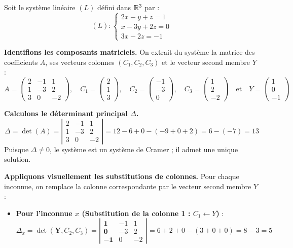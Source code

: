 \documentclass[12pt, a4paper]{report}
\begin{document}
\begin{example}
    Soit le système linéaire $(L)$ défini dans $\mathbb{R}^3$ par :
    $$(L) : \begin{cases}
        2x - y + z = 1 \\
        x - 3y + 2z = 0 \\
        3x - 2z = -1
    \end{cases}$$

    \textbf{Identifions les composants matriciels.} On extrait du système la matrice des coefficients $A$, ses vecteurs colonnes $(C_1, C_2, C_3)$ et le vecteur second membre $Y$ :
    $$A = \begin{pmatrix} 2 & -1 & 1 \\ 1 & -3 & 2 \\ 3 & 0 & -2 \end{pmatrix}, \quad 
    C_1 = \begin{pmatrix} 2 \\ 1 \\ 3 \end{pmatrix}, \quad 
    C_2 = \begin{pmatrix} -1 \\ -3 \\ 0 \end{pmatrix}, \quad 
    C_3 = \begin{pmatrix} 1 \\ 2 \\ -2 \end{pmatrix} \quad \text{et} \quad 
    Y = \begin{pmatrix} 1 \\ 0 \\ -1 \end{pmatrix}$$

    \textbf{Calculons le déterminant principal $\Delta$.}
    $$\Delta = \det(A) = \left|\begin{matrix} 2 & -1 & 1 \\ 1 & -3 & 2 \\ 3 & 0 & -2 \end{matrix}\right| = 12 - 6 + 0 - (-9 + 0 + 2) = 6 - (-7) = 13$$
    Puisque $\Delta \neq 0$, le système est un système de Cramer ; il admet une unique solution.

    \textbf{Appliquons visuellement les substitutions de colonnes.} Pour chaque inconnue, on remplace la colonne correspondante par le vecteur second membre $Y$ :

    \begin{itemize}
        \item \textbf{Pour l'inconnue $x$ (Substitution de la colonne 1 : $C_1 \leftarrow Y$)} :
        $$\Delta_x = \det(\mathbf{Y}, C_2, C_3) = \left|\begin{matrix} \mathbf{1} & -1 & 1 \\ \mathbf{0} & -3 & 2 \\ \mathbf{-1} & 0 & -2 \end{matrix}\right| = 6 + 2 + 0 - (3 + 0 + 0) = 8 - 3 = 5$$
        

\end{itemize}
\end{example}
\end{document}
